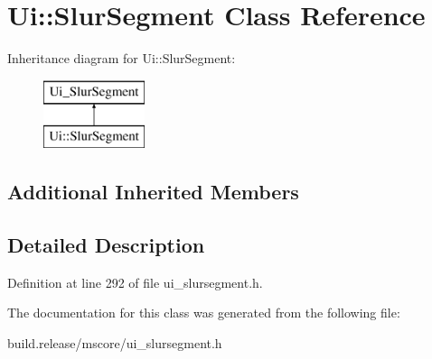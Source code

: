 \hypertarget{class_ui_1_1_slur_segment}{}\section{Ui\+:\+:Slur\+Segment Class Reference}
\label{class_ui_1_1_slur_segment}
Inheritance diagram for Ui\+:\+:Slur\+Segment\+:\begin{figure}[H]
\begin{center}
\leavevmode
\includegraphics[height=2.000000cm]{class_ui_1_1_slur_segment}
\end{center}
\end{figure}
\subsection*{Additional Inherited Members}


\subsection{Detailed Description}


Definition at line 292 of file ui\+\_\+slursegment.\+h.



The documentation for this class was generated from the following file\+:\begin{DoxyCompactItemize}
\item 
build.\+release/mscore/ui\+\_\+slursegment.\+h\end{DoxyCompactItemize}
